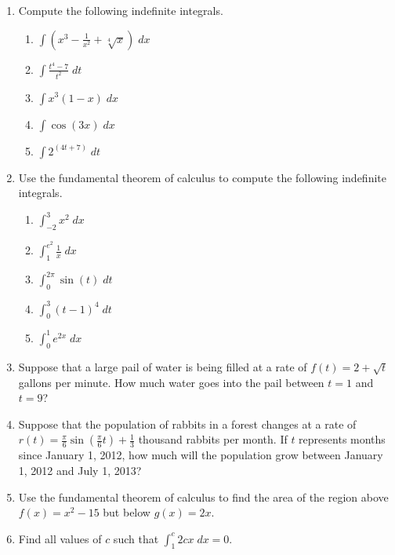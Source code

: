 \documentclass[11pt]{article}
\begin{document}
\drawtitle

\begin{enumerate}
  
\item Compute the following indefinite integrals.
  \begin{enumerate}
  \item $\displaystyle\int \left( x^3 - \frac{1}{x^2} +
      \sqrt[4]{x}\right)\;dx$
    \vfill
  \item $\displaystyle\int \frac{t^4-7}{t^2}\;dt$
    \vfill
  \item $\displaystyle\int x^3\left( 1 - x\right)\;dx$
    \vfill

    \newpage

  \item $\displaystyle\int \cos(3x)\;dx$
    \vfill

  \item $\displaystyle\int 2^(4t+7)\;dt$
    \vfill
  \end{enumerate}
  
  \newpage

\item Use the fundamental theorem of calculus to compute the following
  indefinite integrals.
  \begin{enumerate}
  \item $\displaystyle\int_{-2}^3 x^2\;dx$
    \vfill
  \item $\displaystyle\int_1^{e^2} \frac{1}{x}\;dx$
    \vfill
  \item $\displaystyle\int_0^{2\pi} \sin(t)\;dt$
    \vfill

    \newpage
    
  \item $\displaystyle\int_0^3 (t-1)^4\;dt$
    \vfill

  \item $\displaystyle\int_0^1 e^{2x}\;dx$
    \vfill
  \end{enumerate}
  
  \newpage
  
\item Suppose that a large pail of water is being filled at a rate of
  $f(t) = 2+\sqrt{t}$ gallons per minute.  How much water goes into
  the pail between $t = 1$ and $t = 9$?
  
  \vfill

\item Suppose that the population of rabbits in a forest changes at a
  rate of $r(t) = \frac{\pi}{6}\sin\left(\frac{\pi}{6}t\right) +
  \frac{1}{3}$ thousand rabbits per month.  If $t$ represents months
  since January 1, 2012, how much will the population grow between
  January 1, 2012 and July 1, 2013?

  \vfill

  \newpage
  
\item Use the fundamental theorem of calculus to find the area of the
  region above $f(x) = x^2 - 15$ but below $g(x) = 2x$.
  
  \vfill

\item Find all values of $c$ such that $\displaystyle\int_{1}^c 2cx\; dx = 0$.

  \vfill

\end{enumerate}
\end{document}
